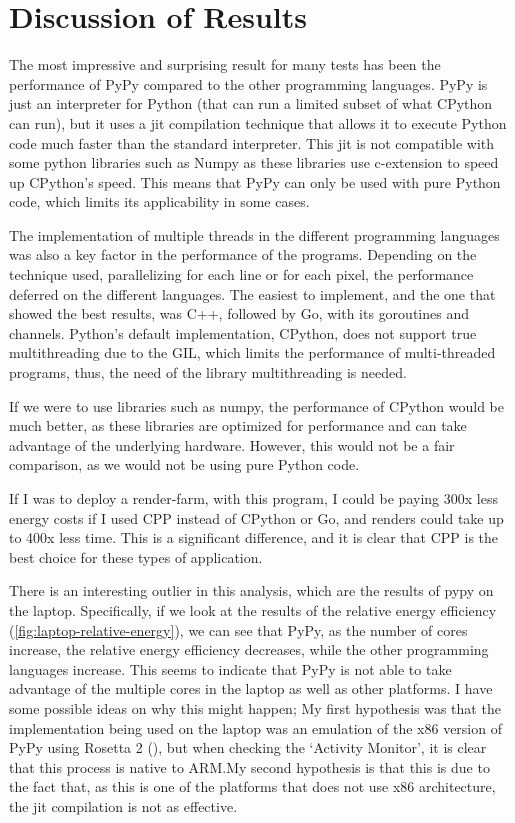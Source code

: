 

\section{Discussion of Results}

The most impressive and surprising result for many tests has been the performance of PyPy compared to the other programming languages. PyPy is just an interpreter for Python (that can run a limited subset of what \gls{CPython} can run), but it uses a \gls{jit} compilation technique that allows it to execute Python code much faster than the standard interpreter. This \gls{jit} is not compatible with some python libraries such as Numpy \cite{numpy} as these libraries use \gls{c-extension} to speed up \gls{CPython}'s speed. This means that PyPy can only be used with pure Python code, which limits its applicability in some cases.

The implementation of multiple threads in the different programming languages was also a key factor in the performance of the programs. Depending on the technique used, parallelizing for each line or for each pixel, the performance deferred on the different languages. The easiest to implement, and the one that showed the best results, was C++, followed by Go, with its \glspl{goroutine} and \glspl{channel}. Python's default implementation, \gls{CPython}, does not support true multithreading due to the \gls{GIL}, which limits the performance of multi-threaded programs, thus, the need of the library multithreading is needed.

If we were to use libraries such as \Gls{numpy}, the performance of \gls{CPython} would be much better, as these libraries are optimized for performance and can take advantage of the underlying hardware. However, this would not be a fair comparison, as we would not be using pure Python code.

If I was to deploy a render-farm, with this program, I could be paying 300x less energy costs if I used \gls{CPP} instead of \gls{CPython} or Go, and renders could take up to 400x less time. This is a significant difference, and it is clear that \gls{CPP} is the best choice for these types of application.

There is an interesting outlier in this analysis, which are the results of pypy on the laptop. Specifically, if we look at the results of the relative energy efficiency (\autoref{fig:laptop-relative-energy}), we can see that PyPy, as the number of cores increase, the relative energy efficiency decreases, while the other programming languages increase. This seems to indicate that PyPy is not able to take advantage of the multiple cores in the laptop as well as other platforms. I have some possible ideas on why this might happen; My first hypothesis was that the implementation being used on the laptop was an emulation of the x86 version of PyPy using Rosetta 2 (\cite{apple:rosetta2}), but when checking the `Activity Monitor', it is clear that this process is native to \gls{ARM}.\@ My second hypothesis is that this is due to the fact that, as this is one of the platforms that does not use x86 architecture, the \gls{jit} compilation is not as effective.

